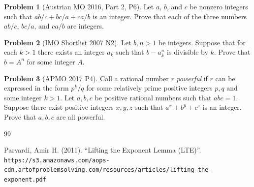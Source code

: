 \documentclass[11pt]{article}
\theoremstyle{definition}
\newtheorem{problem}{Problem}
\begin{document}
\begin{problem}[Austrian MO 2016, Part 2, P6]
Let $a$, $b$, and $c$ be nonzero integers such that $ab/c + bc/a + ca/b$ is an integer. Prove that each of the three numbers $ab/c$, $bc/a$, and $ca/b$ are integers.
\end{problem}

\begin{problem}[IMO Shortlist 2007 N2]
Let $b, n > 1$ be integers. Suppose that for each $k > 1$ there exists an integer $a_k$ such that $b - a^n_k$ is divisible by $k$. Prove that $b = A^n$ for some integer $A$.
\end{problem}

\begin{problem}[APMO 2017 P4]
Call a rational number $r$ \textit{powerful} if $r$ can be expressed in the form $p^k/q$ for some relatively prime positive integers $p, q$ and some integer $k > 1$. Let $a, b, c$ be positive rational numbers such that $abc = 1$. Suppose there exist positive integers $x, y, z$ such that $a^x + b^y + c^z$ is an integer. Prove that $a, b, c$ are all powerful.
\end{problem}

\begin{thebibliography}{99}

 Parvardi, Amir H. (2011). ``Lifting the Exponent Lemma (LTE)''. \texttt{https://s3.amazonaws.com/aops-cdn.artofproblemsolving.com/resources/articles/lifting-the-exponent.pdf}

\end{thebibliography}
\end{document}
